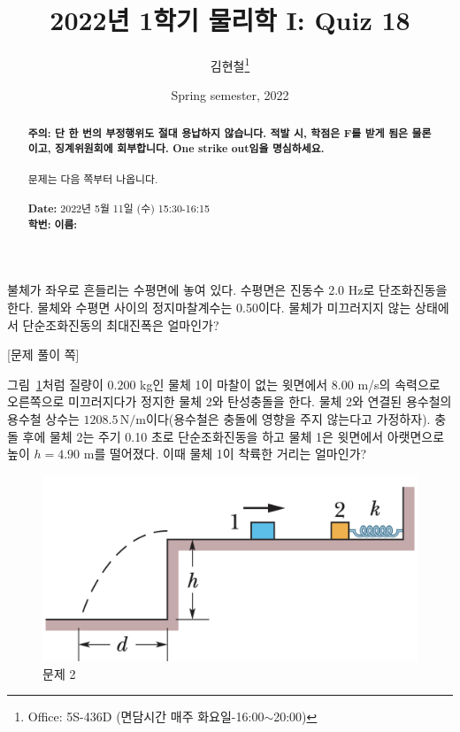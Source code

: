 \documentclass[floatfix,nofootinbib,superscriptaddress,fleqn,preprint]{revtex4-2}
\begin{document}
\title{\Large 2022년 1학기 물리학 I: Quiz 18}
\author{김현철\footnote{Office: 5S-436D (면담시간 매주
    화요일-16:00$\sim$20:00)}} 
\date{Spring semester, 2022}


\vspace{1.cm}
\begin{abstract}
\noindent \textbf{ {\color{red}주의}: \color{blue} 단 한 번의 부정행위도 절대
  용납하지 않습니다. 적발 시, 학점은 F를 받게 됨은 물론이고,
  징계위원회에 회부합니다. One strike out임을 명심하세요.}\\
\\
문제는 다음 쪽부터 나옵니다.  \\ \\
{\bf Date:} 2022년 5월 11일 (수) 15:30-16:15
\\
{\bf 학번:} \hspace{4cm}
{\bf 이름:} 

\end{abstract}
\maketitle

\newpage
{} 
불체가 좌우로 흔들리는 수평면에 놓여 있다. 수평면은 진동수 2.0 Hz로
단조화진동을 한다. 물체와 수평면 사이의 정지마찰계수는
0.50이다. 물체가 미끄러지지 않는 상태에서 단순조화진동의 최대진폭은
얼마인가? 
 \newpage

{\color{gray} [문제 풀이 쪽]}

\newpage

그림~\ref{fig:1}처럼 질량이 $0.200$ kg인 물체 1이 마찰이 없는 윗면에서
8.00 m/s의 속력으로 오른쪽으로 미끄러지다가 정지한 물체 2와
탄성충돌을 한다. 물체 2와 연결된 용수철의 용수철 상수는
$1208.5\,\mathrm{N/m}$이다(용수철은 충돌에 영향을 주지 않는다고 가정하자).
충돌 후에 물체 2는 주기 0.10 초로 단순조화진동을 하고 물체 1은
윗면에서 아랫면으로 높이 $h=4.90$ m를 떨어졌다. 이때 물체 1이 착륙한
거리는 얼마인가? 
\begin{figure}[ht]
  \centering
\includegraphics[scale=0.35]{Qfig18-1-20220511.png}
  \caption{문제 2}
  \label{fig:1}
\end{figure}
\end{document}
